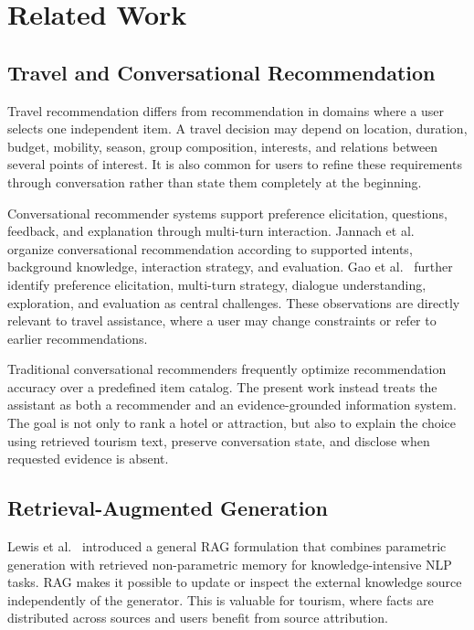 \chapter{Related Work}
\label{chap:related-work}

\section{Travel and Conversational Recommendation}

Travel recommendation differs from recommendation in domains where a user
selects one independent item. A travel decision may depend on location,
duration, budget, mobility, season, group composition, interests, and relations
between several points of interest. It is also common for users to refine these
requirements through conversation rather than state them completely at the
beginning.

Conversational recommender systems support preference elicitation, questions,
feedback, and explanation through multi-turn interaction. Jannach et
al.~\cite{jannach2021conversational} organize conversational recommendation
according to supported intents, background knowledge, interaction strategy,
and evaluation. Gao et al.~\cite{gao2021conversational} further identify
preference elicitation, multi-turn strategy, dialogue understanding,
exploration, and evaluation as central challenges. These observations are
directly relevant to travel assistance, where a user may change constraints or
refer to earlier recommendations.

Traditional conversational recommenders frequently optimize recommendation
accuracy over a predefined item catalog. The present work instead treats the
assistant as both a recommender and an evidence-grounded information system.
The goal is not only to rank a hotel or attraction, but also to explain the
choice using retrieved tourism text, preserve conversation state, and disclose
when requested evidence is absent.

\section{Retrieval-Augmented Generation}

Lewis et al.~\cite{lewis2020rag} introduced a general RAG formulation that
combines parametric generation with retrieved non-parametric memory for
knowledge-intensive NLP tasks. RAG makes it possible to update or inspect the
external knowledge source independently of the generator. This is valuable for
tourism, where facts are distributed across sources and users benefit from
source attribution.

